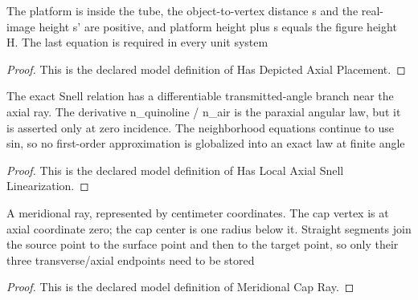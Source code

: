 \begin{definition}
  \label{def:physics:phyx-mini-0110:phyxminiproblems-problemphyxmini0110-hasdepictedaxialplacement}
  The platform is inside the tube, the object-to-vertex distance s and the real-image height s' are positive, and platform height plus s equals the figure height H. The last equation is required in every unit system
\end{definition}
\begin{proof}
  This is the declared model definition of Has Depicted Axial Placement.
\end{proof}
\begin{definition}
  \label{def:physics:phyx-mini-0110:phyxminiproblems-problemphyxmini0110-haslocalaxialsnelllinearization}
  The exact Snell relation has a differentiable transmitted-angle branch near the axial ray. The derivative n\_quinoline / n\_air is the paraxial angular law, but it is asserted only at zero incidence. The neighborhood equations continue to use sin, so no first-order approximation is globalized into an exact law at finite angle
\end{definition}
\begin{proof}
  This is the declared model definition of Has Local Axial Snell Linearization.
\end{proof}
\begin{definition}
  \label{def:physics:phyx-mini-0110:phyxminiproblems-problemphyxmini0110-meridionalcapray}
  A meridional ray, represented by centimeter coordinates. The cap vertex is at axial coordinate zero; the cap center is one radius below it. Straight segments join the source point to the surface point and then to the target point, so only their three transverse/axial endpoints need to be stored
\end{definition}
\begin{proof}
  This is the declared model definition of Meridional Cap Ray.
\end{proof}
